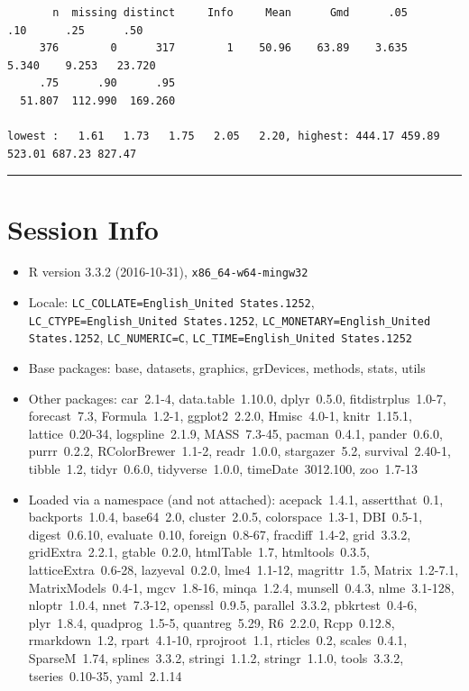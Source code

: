 \documentclass[]{elsarticle} %
\begin{document}
\begin{spacing}{0.7}
{{\smaller
\begin{verbatim}
       n  missing distinct     Info     Mean      Gmd      .05      .10      .25      .50 
     376        0      317        1    50.96    63.89    3.635    5.340    9.253   23.720 
     .75      .90      .95 
  51.807  112.990  169.260 

lowest :   1.61   1.73   1.75   2.05   2.20, highest: 444.17 459.89 523.01 687.23 827.47
\end{verbatim}
}
\smallskip\hrule\smallskip
}\end{spacing}

\section{Session Info}\label{session-info}

\begin{itemize}\raggedright
  \item R version 3.3.2 (2016-10-31), \verb|x86_64-w64-mingw32|
  \item Locale: \verb|LC_COLLATE=English_United States.1252|, \verb|LC_CTYPE=English_United States.1252|, \verb|LC_MONETARY=English_United States.1252|, \verb|LC_NUMERIC=C|, \verb|LC_TIME=English_United States.1252|
  \item Base packages: base, datasets, graphics, grDevices,
    methods, stats, utils
  \item Other packages: car~2.1-4, data.table~1.10.0, dplyr~0.5.0,
    fitdistrplus~1.0-7, forecast~7.3, Formula~1.2-1,
    ggplot2~2.2.0, Hmisc~4.0-1, knitr~1.15.1, lattice~0.20-34,
    logspline~2.1.9, MASS~7.3-45, pacman~0.4.1, pander~0.6.0,
    purrr~0.2.2, RColorBrewer~1.1-2, readr~1.0.0, stargazer~5.2,
    survival~2.40-1, tibble~1.2, tidyr~0.6.0, tidyverse~1.0.0,
    timeDate~3012.100, zoo~1.7-13
  \item Loaded via a namespace (and not attached): acepack~1.4.1,
    assertthat~0.1, backports~1.0.4, base64~2.0, cluster~2.0.5,
    colorspace~1.3-1, DBI~0.5-1, digest~0.6.10, evaluate~0.10,
    foreign~0.8-67, fracdiff~1.4-2, grid~3.3.2, gridExtra~2.2.1,
    gtable~0.2.0, htmlTable~1.7, htmltools~0.3.5,
    latticeExtra~0.6-28, lazyeval~0.2.0, lme4~1.1-12,
    magrittr~1.5, Matrix~1.2-7.1, MatrixModels~0.4-1, mgcv~1.8-16,
    minqa~1.2.4, munsell~0.4.3, nlme~3.1-128, nloptr~1.0.4,
    nnet~7.3-12, openssl~0.9.5, parallel~3.3.2, pbkrtest~0.4-6,
    plyr~1.8.4, quadprog~1.5-5, quantreg~5.29, R6~2.2.0,
    Rcpp~0.12.8, rmarkdown~1.2, rpart~4.1-10, rprojroot~1.1,
    rticles~0.2, scales~0.4.1, SparseM~1.74, splines~3.3.2,
    stringi~1.1.2, stringr~1.1.0, tools~3.3.2, tseries~0.10-35,
    yaml~2.1.14
\end{itemize}
\end{document}
